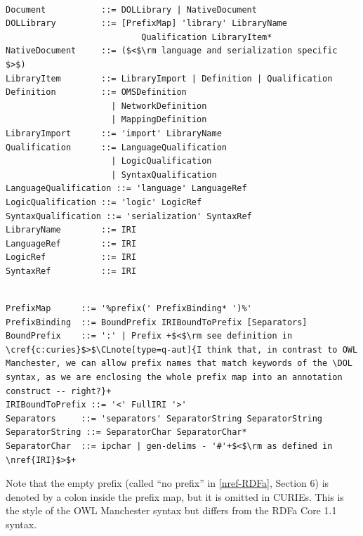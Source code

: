 \documentclass[10pt, a4paper]{isov2}
\makeatletter
\newcommand*\CommentAuthor{}
\renewcommand*\CommentAuthor{#1}}
\newcommand*\CommentDate{}
\renewcommand*\CommentDate{#1}}
\newcommand*\CommentId{}
\renewcommand*\CommentId{#1}}
\newcommand*\CommentType{}
\renewcommand*\CommentType{#1}}
\newcommand*{\SetCommentColorByType}[1]{%
\edef\localType{{#1}}%
\expandafter\ifstrequal\localType{q-aut}{\colorlet{CommentColor}{red}}{%
\expandafter\ifstrequal\localType{q-all}{\colorlet{CommentColor}{orange}}{%
\expandafter\ifstrequal\localType{todo}{\colorlet{CommentColor}{orange}}{%
\expandafter\ifstrequal\localType{fyi}{\colorlet{CommentColor}{lightgray}}{%
\colorlet{CommentColor}{yellow}}}}}}
\newcommand*{\SetCommentPrefixByType}[1]{%
\edef\localType{{#1}}%
\expandafter\@ifmtarg\localType{%
\edef\CommentPrefix{}%
}{%
\caseupper[q]{#1}%
\edef\CommentPrefix{\thestring: }%
}}
\newcommand*{\initComment}[1]{%
\setkeys{Comment}{#1}%
\SetCommentColorByType{\CommentType}%
\relax%
\SetCommentPrefixByType{\CommentType}%
\relax%
}
\newcommand*{\todonote}[2][]{%
\initComment{#1}%
\pdfcomment[author=\CommentAuthor,color=CommentColor,date=\CommentDate,id=\CommentId]{%
\CommentPrefix
#2}}
\renewcommand*{\todonote}[2][]{%
\initComment{#1}%
\ednote{\CommentPrefix #2}}
\newcommand*{\CLnote}[2][author=Christoph Lange]{%
\todonote[author=Christoph Lange,#1]{#2}}
\newcommand*{\DOL}{\ensuremath{\mathsf{DOL}}\xspace}
\renewcommand{\clauserefname}{clause}
\renewcommand{\noterefname}{note}
\renewcommand{\cref}[1]{\clauserefname~\ref{#1}}
\renewcommand{\nref}[1]{\noterefname~\ref{#1}}
\renewcommand{\nref}[1]{\ref{nref-#1}}
\makeatother
\begin{document}
\begin{lstlisting}[language=ebnf,escapeinside={()},morecomment={[l]{\%\%\ }}]

Document           ::= DOLLibrary | NativeDocument
DOLLibrary         ::= [PrefixMap] 'library' LibraryName
                           Qualification LibraryItem*
NativeDocument     ::= ($<$\rm language and serialization specific $>$) 
LibraryItem        ::= LibraryImport | Definition | Qualification
Definition         ::= OMSDefinition
                     | NetworkDefinition
                     | MappingDefinition
LibraryImport      ::= 'import' LibraryName
Qualification      ::= LanguageQualification
                     | LogicQualification
                     | SyntaxQualification
LanguageQualification ::= 'language' LanguageRef
LogicQualification ::= 'logic' LogicRef
SyntaxQualification ::= 'serialization' SyntaxRef
LibraryName        ::= IRI
LanguageRef        ::= IRI
LogicRef           ::= IRI
SyntaxRef          ::= IRI
\end{lstlisting}


\begin{lstlisting}[language=ebnf,escapechar=+,morecomment={[l]{\%\%\ }}]

PrefixMap      ::= '%prefix(' PrefixBinding* ')%'
PrefixBinding  ::= BoundPrefix IRIBoundToPrefix [Separators]
BoundPrefix    ::= ':' | Prefix +$<$\rm see definition in \cref{c:curies}$>$\CLnote[type=q-aut]{I think that, in contrast to OWL Manchester, we can allow prefix names that match keywords of the \DOL syntax, as we are enclosing the whole prefix map into an annotation construct -- right?}+
IRIBoundToPrefix ::= '<' FullIRI '>'
Separators     ::= 'separators' SeparatorString SeparatorString
SeparatorString ::= SeparatorChar SeparatorChar*
SeparatorChar  ::= ipchar | gen-delims - '#'+$<$\rm as defined in \nref{IRI}$>$+
\end{lstlisting}


 Note that the empty prefix (called ``no prefix'' in \nref{RDFa}, Section 6) is denoted by a colon inside the prefix map, but it is omitted in CURIEs.  This is the style of the OWL Manchester syntax \cite{W3C:NOTE-owl2-manchester-syntax-20091027} but differs from the RDFa Core 1.1 syntax.

\vspace{1em}
	


\end{document}
